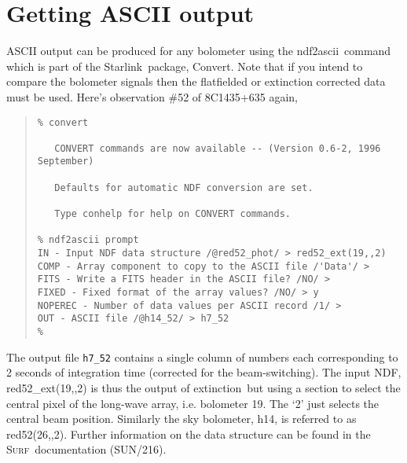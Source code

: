 \documentclass[twoside,11pt,fleqn]{article}
\newenvironment{myquote}{\begin{quote}\begin{small}}{\end{small}\end{quote}}
\newcommand{\starlink}{\htmladdnormallink{Starlink}{http://www.starlink.ac.uk/}}
\newcommand{\convert}{\xref{{\sc Convert}}{sun55}{}}
\newcommand{\surf}{\xref{\textsc{Surf}}{sun216}{}}
\newcommand{\task}[1]{{\sf #1}}
\newcommand{\ext}{\xref{\task{extinction}}{sun216}{EXTINCTION}}
\newcommand{\ndfascii}{\xref{\task{ndf2ascii}}{sun55}{NDF2ASCII}}
\newcommand{\htmladdnormallink}[2]{#1}
\newcommand{\xref}[3]{#1}
\begin{document}
\appendix
\section{Getting ASCII output}

ASCII output can be produced for any bolometer using the \ndfascii\ command
which is part of the \starlink\ package, \convert.  Note that if you intend
to compare the bolometer signals then the flatfielded or extinction corrected
data must be used. Here's observation \#52 of 8C1435+635 again,

\begin{myquote}
\begin{verbatim}
% convert

   CONVERT commands are now available -- (Version 0.6-2, 1996 September)

   Defaults for automatic NDF conversion are set.

   Type conhelp for help on CONVERT commands.

% ndf2ascii prompt
IN - Input NDF data structure /@red52_phot/ > red52_ext(19,,2)
COMP - Array component to copy to the ASCII file /'Data'/ >
FITS - Write a FITS header in the ASCII file? /NO/ >
FIXED - Fixed format of the array values? /NO/ > y
NOPEREC - Number of data values per ASCII record /1/ >
OUT - ASCII file /@h14_52/ > h7_52
%
\end{verbatim}
\end{myquote}

The output file {\tt h7\_52} contains a single column of numbers each
corresponding to 2 seconds of integration time (corrected for the
beam-switching). The input NDF, red52\_ext(19,,2) is thus the output
of \ext\ but using a section to select the central pixel of
the long-wave array, i.e. bolometer 19.  The `2' just selects the
central beam position. Similarly the sky bolometer, h14, is referred
to as red52(26,,2). Further information on the data structure can be
found in the \surf\ documentation (\xref{SUN/216}{sun216}{}).

\end{document}
